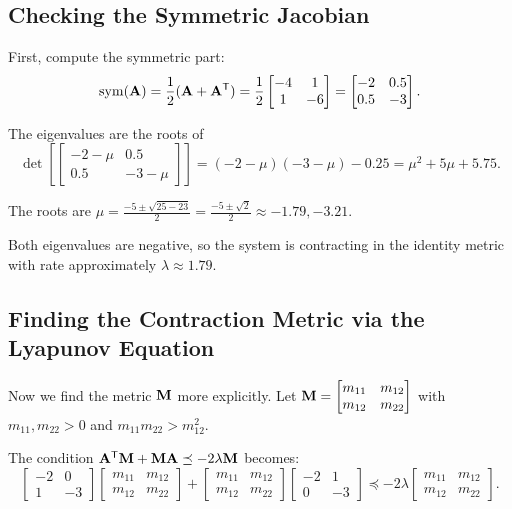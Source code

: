 \subsection{Checking the Symmetric Jacobian}

First, compute the symmetric part:
\begin{equation}
\operatorname{sym}(\mathbf{A}) = \frac{1}{2}(\mathbf{A} + \mathbf{A}^{\mathsf{T}}) = \frac{1}{2}\begin{bmatrix}
-4 & 1 \\ 1 & -6
\end{bmatrix} = \begin{bmatrix} -2 & 0.5 \\ 0.5 & -3 \end{bmatrix}.
\end{equation}

The eigenvalues are the roots of
\begin{equation}
\det\!\left[\begin{bmatrix} -2-\mu & 0.5 \\ 0.5 & -3-\mu \end{bmatrix}\right]
= (-2-\mu)(-3-\mu) - 0.25 = \mu^2 + 5\mu + 5.75.
\end{equation}

The roots are $\mu = \frac{-5 \pm \sqrt{25-23}}{2} = \frac{-5 \pm \sqrt{2}}{2} \approx -1.79, -3.21$.

Both eigenvalues are negative, so the system is contracting in the identity metric with
rate approximately $\lambda \approx 1.79$.

\subsection{Finding the Contraction Metric via the Lyapunov Equation}

Now we find the metric $\mathbf{M}$ more explicitly. Let $\mathbf{M} = \begin{bmatrix} m_{11} & m_{12} \\
m_{12} & m_{22} \end{bmatrix}$ with $m_{11}, m_{22} > 0$ and $m_{11}m_{22} > m_{12}^2$.

The condition $\mathbf{A}^{\mathsf{T}}\mathbf{M} + \mathbf{M}\mathbf{A} \preceq -2\lambda\mathbf{M}$ becomes:
\begin{equation}
\begin{bmatrix} -2 & 0 \\ 1 & -3 \end{bmatrix}
\begin{bmatrix} m_{11} & m_{12} \\ m_{12} & m_{22} \end{bmatrix}
+
\begin{bmatrix} m_{11} & m_{12} \\ m_{12} & m_{22} \end{bmatrix}
\begin{bmatrix} -2 & 1 \\ 0 & -3 \end{bmatrix}
\preceq -2\lambda \begin{bmatrix} m_{11} & m_{12} \\ m_{12} & m_{22} \end{bmatrix}.
\end{equation}

